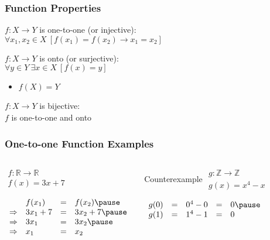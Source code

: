 \documentclass[dvipsnames]{beamer}
\begin{document}
\begin{frame}
  \frametitle{Function Properties}

  \begin{definition}
    $f: X \rightarrow Y$ is \alert{one-to-one} (or \alert{injective}):\\
      $\forall x_1,x_2 \in X~[f(x_1)=f(x_2) \rightarrow x_1=x_2]$
  \end{definition}

  \pause
  \begin{definition}
    $f: X \rightarrow Y$ is \alert{onto} (or \alert{surjective}):\\
    $\forall y \in Y~\exists x \in X~[f(x)=y]$

    \begin{itemize}
      \item $f(X)=Y$
    \end{itemize}
  \end{definition}

  \pause
  \begin{definition}
    $f: X \rightarrow Y$ is \alert{bijective}:\\
    $f$ is one-to-one and onto
  \end{definition}
\end{frame}

\begin{frame}
  \frametitle{One-to-one Function Examples}

  \begin{columns}[t]
    \begin{example}
      $\begin{array}{l}
        f: \mathbb{R} \rightarrow \mathbb{R}\\
        f(x) = 3x + 7
      \end{array}$

      \pause
      \bigskip
      $\begin{array}{llll}
                    & f(x_1)    & = & f(x_2)\pause\\
        \Rightarrow & 3 x_1 + 7 & = & 3 x_2 + 7\pause\\
        \Rightarrow & 3 x_1     & = & 3 x_2\pause\\
        \Rightarrow & x_1       & = & x_2
      \end{array}$
    \end{example}

    \pause
    \begin{block}{Counterexample}
      $\begin{array}{l}
        g: \mathbb{Z} \rightarrow \mathbb{Z}\\
        g(x) = x^4 - x
      \end{array}$

      \pause
      \bigskip
      $\begin{array}{lllll}
        g(0) & = & 0^4 - 0 & = & 0\pause\\
        g(1) & = & 1^4 - 1 & = & 0
      \end{array}$
    \end{block}
  \end{columns}
\end{frame}
\end{document}
